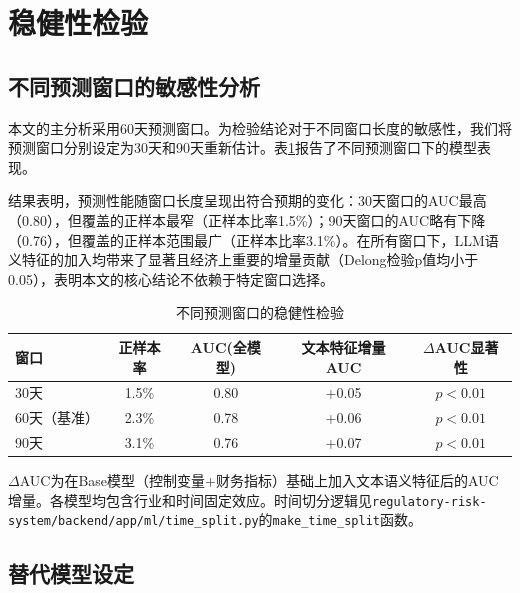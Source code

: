 
\section{稳健性检验}

\subsection{不同预测窗口的敏感性分析}

本文的主分析采用60天预测窗口。为检验结论对于不同窗口长度的敏感性，我们将预测窗口分别设定为30天和90天重新估计。表\ref{tab:windows}报告了不同预测窗口下的模型表现。

结果表明，预测性能随窗口长度呈现出符合预期的变化：30天窗口的AUC最高（0.80），但覆盖的正样本最窄（正样本比率1.5\%）；90天窗口的AUC略有下降（0.76），但覆盖的正样本范围最广（正样本比率3.1\%）。在所有窗口下，LLM语义特征的加入均带来了显著且经济上重要的增量贡献（Delong检验p值均小于0.05），表明本文的核心结论不依赖于特定窗口选择。

\begin{table}[H]
\centering
\caption{不同预测窗口的稳健性检验}
\label{tab:windows}
\begin{threeparttable}
\begin{tabular}{lcccc}
\toprule
窗口 & 正样本率 & AUC(全模型) & 文本特征增量AUC & $\Delta$AUC显著性 \\
\midrule
30天 & 1.5\% & 0.80 & +0.05 & $p<0.01$ \\
60天（基准） & 2.3\% & 0.78 & +0.06 & $p<0.01$ \\
90天 & 3.1\% & 0.76 & +0.07 & $p<0.01$ \\
\bottomrule
\end{tabular}
\begin{tablenotes}
\item[注] $\Delta$AUC为在Base模型（控制变量+财务指标）基础上加入文本语义特征后的AUC增量。各模型均包含行业和时间固定效应。时间切分逻辑见\texttt{regulatory-risk-system/backend/app/ml/time\_split.py}的\texttt{make\_time\_split}函数。
\end{tablenotes}
\end{threeparttable}
\end{table}

\subsection{替代模型设定}

